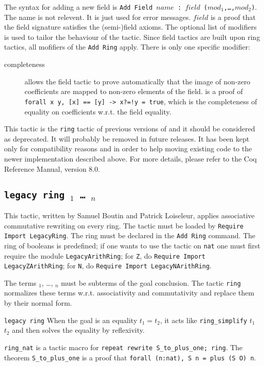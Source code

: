 The syntax for adding a new field is {\tt Add Field $name$ : $field$
($mod_1$,\dots,$mod_2$)}.  The name is not relevent. It is just used
for error messages. $field$ is a proof that the field signature
satisfies the (semi-)field axioms. The optional list of modifiers is
used to tailor the behaviour of the tactic. Since field tactics are
built upon ring tactics, all mofifiers of the {\tt Add Ring}
apply. There is only one specific modifier:
\begin{description}
\item[completeness \term] allows the field tactic to prove
  automatically that the image of non-zero coefficients are mapped to
  non-zero elements of the field. \term is a proof of {\tt forall x y,
    [x] == [y] -> x?=!y = true}, which is the completeness of equality
  on coefficients w.r.t. the field equality.
\end{description}


\Warning This tactic is the {\tt ring} tactic of previous versions of
\Coq{} and it should be considered as deprecated. It will probably be
removed in future releases. It has been kept only for compatibility
reasons and in order to help moving existing code to the newer
implementation described above. For more details, please refer to the
Coq Reference Manual, version 8.0.


\subsection{\tt legacy ring \term$_1$ \dots\ \term$_n$
}

This tactic, written by Samuel Boutin and Patrick Loiseleur, applies
associative commutative rewriting on every ring.  The tactic must be
loaded by \texttt{Require Import LegacyRing}. The ring must be declared in
the \texttt{Add Ring} command. The ring of booleans
is predefined; if one wants to use the tactic on \texttt{nat} one must
first require the module \texttt{LegacyArithRing}; for \texttt{Z}, do
\texttt{Require Import LegacyZArithRing}; for \texttt{N}, do \texttt{Require
Import LegacyNArithRing}.

The terms \term$_1$, \dots, \term$_n$ must be subterms of the goal
conclusion. The tactic \texttt{ring} normalizes these terms
w.r.t. associativity and commutativity and replace them by their
normal form.

\begin{Variants}
\item \texttt{legacy ring} When the goal is an equality $t_1=t_2$, it
  acts like \texttt{ring\_simplify} $t_1$ $t_2$ and then
  solves the equality by reflexivity.

\item \texttt{ring\_nat} is a tactic macro for \texttt{repeat rewrite
    S\_to\_plus\_one; ring}. The theorem \texttt{S\_to\_plus\_one} is a
  proof that \texttt{forall (n:nat), S n = plus (S O) n}.

\end{Variants}

